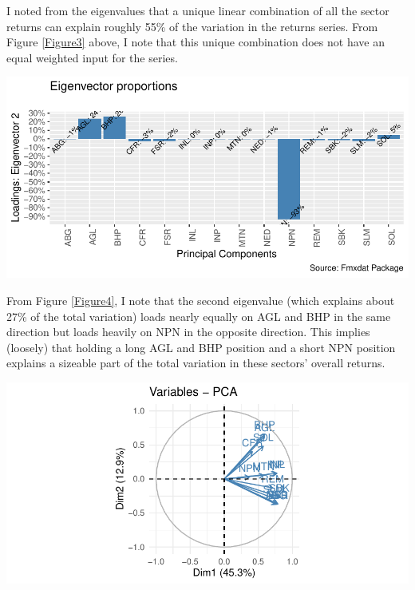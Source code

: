 \documentclass[11pt,preprint, authoryear]{elsarticle}
\let\origfigure\figure
\let\endorigfigure\endfigure
\renewenvironment{figure}[1][2] {
    \expandafter\origfigure\expandafter[H]
} {
    \endorigfigure
}
\numberwithin{equation}{section}
\numberwithin{figure}{section}
\numberwithin{table}{section}
\begin{document}
I noted from the eigenvalues that a unique linear combination of all the
sector returns can explain roughly 55\% of the variation in the returns
series. From Figure \ref{Figure3} above, I note that this unique
combination does not have an equal weighted input for the series.

\begin{figure}[H]

{\centering \includegraphics{Question4_files/figure-latex/Figure4-1} 

}

\caption{Eigenvector proportions \label{Figure4}}\label{fig:Figure4}
\end{figure}

From Figure \ref{Figure4}, I note that the second eigenvalue (which
explains about 27\% of the total variation) loads nearly equally on AGL
and BHP in the same direction but loads heavily on NPN in the opposite
direction. This implies (loosely) that holding a long AGL and BHP
position and a short NPN position explains a sizeable part of the total
variation in these sectors' overall returns.

\begin{figure}[H]

{\centering \includegraphics{Question4_files/figure-latex/Figure5-1} 

}

\caption{PCA variables \label{Figure5}}\label{fig:Figure5}
\end{figure}
\end{document}

